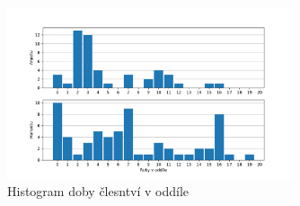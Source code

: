 \begin{figure}[!ht]
  \begin{center}
    \includegraphics[width=0.75\textwidth]{statistika/hist_clen.pdf}
  \end{center}
  \caption{Histogram doby člesntví v oddíle}
  \label{fig:clen}
\end{figure}

\clearpage
